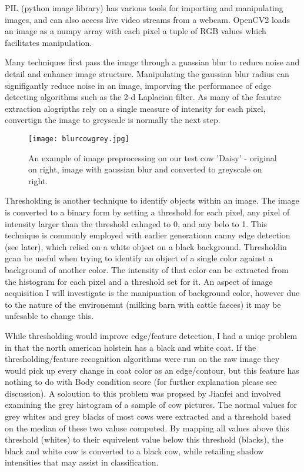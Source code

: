 \documentclass[11pt]{article}
\begin{document}
	PIL (python image library) has various tools for importing and manipulating images, and can also access live video streams from a webcam.
	OpenCV2 loads an image as a numpy array with each pixel a tuple of RGB values which facilitates manipulation.


	Many techniques first pass the image through a guassian blur to reduce noise and detail and enhance image structure. 
	Manipulating the gaussian blur radius can signifigantly reduce noise in an image, imporving the performance of edge detecting algorithms such as the 2-d Laplacian filter.
	As many of the feautre extraction alogripths rely on a single measure of intensity for each pixel, convertign the image to greyscale is normally the next step.

	\begin{figure}[h!]
		\centering
		\texttt{[image: blurcowgrey.jpg]}
		\caption{An example of image preprocessing on our test cow 'Daisy' - original on right, image with gaussian blur and converted to greyscale on right.}
		\label{fig:<+label+>}
	\end{figure}


	Thresholding is another technique to identify objects within an image.
	The image is converted to a binary form by setting a threshold for each pixel, any pixel of intensity larger than the threshold cahnged to 0, and any belo to 1. 
	This technique is commonly employed with earlier generationn canny edge detection (see later), which relied on a white object on a black background.
	Thresholdin gcan be useful when trying to identify an object of a single color against a background of another color. 
	The intensity of that color can be extracted from the histogram for each pixel and a threshold set for it.
	An aspect of image acquisition I will investigate is the manipuation of background color, however due to the nature of the environemnt (milking barn with cattle faeces) it may be unfesable to change this.


	While thresholding would improve edge/feature detection, I had a uniqe problem in that the north american holstein has a black and white coat.
	If the thresholding/feature recognition algorithms were run on the raw image they would pick up every change in coat color as an edge/contour, but this feature has nothing to do with Body condition score (for further explanation please see discussion).
 	A soloution to this problem was propsed by Jianfei \cite{Jianfei2011} and involved examining the grey histogram of a sample of cow pictures.
	The normal values for grey whites and grey blacks of most cows were extracted and a threshold based on the median of these two valuse computed.
	By mapping all values above this threshold (whites) to their equivelent value below this threshold (blacks), the black and white cow is converted to a black cow, while retailing shadow intensities that may assist in classification.
\end{document}
